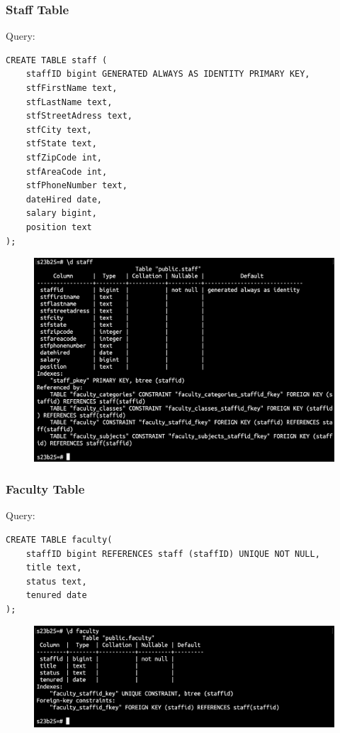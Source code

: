 \documentclass{article}
\begin{document}
\subsubsection*{Staff Table}
Query:
\begin{Verbatim}[frame=single,framerule=1pt,fontfamily=courier,fontsize=\small]
CREATE TABLE staff (
    staffID bigint GENERATED ALWAYS AS IDENTITY PRIMARY KEY,
    stfFirstName text,
    stfLastName text,
    stfStreetAdress text,
    stfCity text,
    stfState text,
    stfZipCode int,
    stfAreaCode int,
    stfPhoneNumber text,
    dateHired date,
    salary bigint,
    position text
);
\end{Verbatim}
\begin{figure}[h]
    \centering
    \includegraphics[width=\textwidth]{./o_1_staff.png}
\end{figure}

\subsubsection*{Faculty Table}
Query:
\begin{Verbatim}[frame=single,framerule=1pt,fontfamily=courier,fontsize=\small]
CREATE TABLE faculty(
    staffID bigint REFERENCES staff (staffID) UNIQUE NOT NULL,
    title text,
    status text,
    tenured date 
);
\end{Verbatim}
\begin{figure}[h]
    \centering
    \includegraphics[width=\textwidth]{./o_2_faculty.png}
\end{figure}
\end{document}
